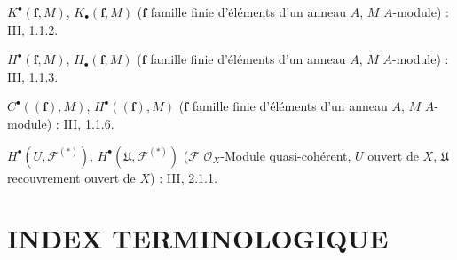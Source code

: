 \begin{flushleft}
$K^\bullet(\mathbf f,M)$, $K_\bullet(\mathbf f,M)$ ($\mathbf f$ famille
finie d'éléments d'un anneau $A$, $M$ $A$-module) : III, 1.1.2.

$H^\bullet(\mathbf f,M)$, $H_\bullet(\mathbf f,M)$ ($\mathbf f$ famille
finie d'éléments d'un anneau $A$, $M$ $A$-module) : III, 1.1.3.

$C^\bullet((\mathbf f),M)$, $H^\bullet((\mathbf f),M)$ ($\mathbf f$ famille
finie d'éléments d'un anneau $A$, $M$ $A$-module) : III, 1.1.6.

$H^\bullet(U,\mathcal F^{(*)})$,
$H^\bullet(\mathfrak U,\mathcal F^{(*)})$ ($\mathcal F$
$\mathcal O_X$-Module quasi-cohérent, $U$ ouvert de $X$, $\mathfrak U$
recouvrement ouvert de $X$) : III, 2.1.1.
\end{flushleft}

\clearpage
{}
\section*{INDEX TERMINOLOGIQUE}

